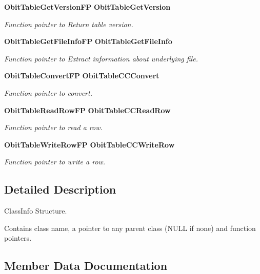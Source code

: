 \begin{CompactItemize}
{\bf Obit\-Table\-Get\-Version\-FP} {\bf Obit\-Table\-Get\-Version}
\begin{CompactList}\small\item\em Function pointer to Return table version. \item\end{CompactList}\item 
{\bf Obit\-Table\-Get\-File\-Info\-FP} {\bf Obit\-Table\-Get\-File\-Info}
\begin{CompactList}\small\item\em Function pointer to Extract information about underlying file. \item\end{CompactList}\item 
{\bf Obit\-Table\-Convert\-FP} {\bf Obit\-Table\-CCConvert}
\begin{CompactList}\small\item\em Function pointer to convert. \item\end{CompactList}\item 
{\bf Obit\-Table\-Read\-Row\-FP} {\bf Obit\-Table\-CCRead\-Row}
\begin{CompactList}\small\item\em Function pointer to read a row. \item\end{CompactList}\item 
{\bf Obit\-Table\-Write\-Row\-FP} {\bf Obit\-Table\-CCWrite\-Row}
\begin{CompactList}\small\item\em Function pointer to write a row. \item\end{CompactList}\end{CompactItemize}


\subsection{Detailed Description}
Class\-Info Structure. 

Contains class name, a pointer to any parent class (NULL if none) and function pointers. 



\subsection{Member Data Documentation}

